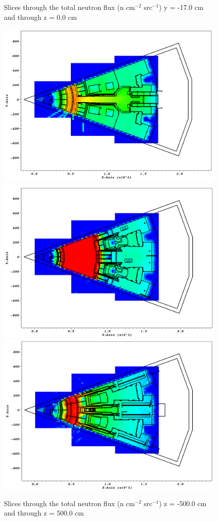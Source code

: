 \documentclass[12pt]{article}
\begin{document}
\begin{figure}[ht!]
  \caption{Slices through the total neutron flux (n cm$^{-2}$ src$^{-1}$)
  y = -17.0 cm and through z = 0.0 cm}
  \label{fig:wwinp}
\end{figure}
\begin{figure}[ht!]
  \centering
  \includegraphics[scale=0.27]{../plots/neutron/nob4c/z_-500.png}
  \includegraphics[scale=0.27]{../plots/neutron/nob4c/z_0.png}       
  \includegraphics[scale=0.27]{../plots/neutron/nob4c/z_500.png}
  \caption{Slices through the total neutron flux (n cm$^{-2}$ src$^{-1}$)
  z = -500.0 cm and through z = 500.0 cm}
  \label{fig:wwinp}
\end{figure}
\newpage
\clearpage
\end{document}
